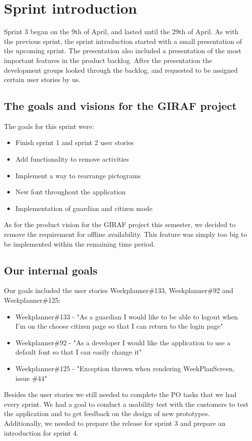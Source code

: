 \section{Sprint introduction}
Sprint 3 began on the 9th of April, and lasted until the 29th of April.
As with the previous sprint, the sprint introduction started with a small presentation of the upcoming sprint. 
The presentation also included a presentation of the most important features in the product backlog.
After the presentation the development groups looked through the backlog, and requested to be assigned certain user stories by us.

\subsection{The goals and visions for the GIRAF project}
The goals for this sprint were:

\begin{itemize}
    \item Finish sprint 1 and sprint 2 user stories
    \item Add functionality to remove activities
    \item Implement a way to rearrange pictograms
    \item New font throughout the application
    \item Implementation of guardian and citizen mode
\end{itemize}

\noindent
As for the product vision for the GIRAF project this semester, we decided to remove the requirement for offline availability. 
This feature was simply too big to be implemented within the remaining time period.

\subsection{Our internal goals}\label{sprint-3-po-goals}
Our goals included the user stories Weekplanner\#133, Weekplanner\#92 and Weekplanner\#125:

\begin{itemize}\label{item:userstories-sprint-3}
    \item Weekplanner\#133 - "As a guardian I would like to be able to logout when I'm on the choose citizen page so that I can return to the login page"
    \item Weekplanner\#92 - "As a developer I would like the application to use a default font so that I can easily change it"
    \item Weekplanner\#125 - "Exception thrown when rendering WeekPlanScreen, issue \#44"
\end{itemize}
\noindent
Besides the user stories we still needed to complete the PO tasks that we had every sprint.
We had a goal to conduct a usability test with the customers to test the application and to get feedback on the design of new prototypes.
Additionally, we needed to prepare the release for sprint 3 and prepare an introduction for sprint 4.


